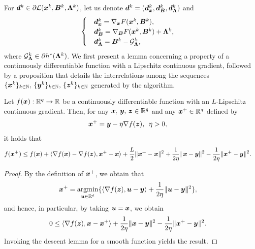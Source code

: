 For $\bm{d}^{k}\in \partial \mathcal{L}(\bm{x}^{k}, \bm{B}^{k}, \bm{\Lambda}^{k})$, let us
denote $\bm{d}^{k}= (\bm{d}_{\bm{x}}^{k}, \bm{d}_{\bm{B}}^{k}, \bm{d}_{\bm{\Lambda}}^{k})$ and
\begin{align}
    \begin{cases}&\bm{d}_{\bm{x}}^{k}= \nabla_{\bm{x}}F(\bm{x}^{k}, \bm{B}^{k}),\\&\bm{d}_{\bm{B}}^{k}= \nabla_{\bm{B}}F(\bm{x}^{k}, \bm{B}^{k}) + \bm{\Lambda}^{k}, \\&\bm{d}_{\bm{\Lambda}}^{k}= \bm{B}^{k}- \mathcal{G}_{\bm{\Lambda}}^{k},\end{cases} \notag
\end{align}
where $\mathcal{G}_{\bm{\Lambda}}^{k}\in \partial h^{*}(\bm{\Lambda}^{k})$.
We first present a lemma concerning a property of a continuously differentiable function with a Lipschitz continuous gradient, followed by a proposition that details the interrelations among the sequences $\{\bm{x}^{k}\}_{k \in \mathbb{N}},\, \{\bm{y}^{k}\}_{k \in \mathbb{N}},\, \{\bm{z}^{k}\}_{k \in \mathbb{N}}$ generated by the algorithm.
\begin{lemma}
    \label{Lemma: auxiliary lemma for f} Let $f(\bm{x}): \mathbb{R}^{q}\rightarrow \mathbb{R}$
    be a continuously differentiable function with an $L$-Lipschitz continuous gradient.
    Then, for any $\bm{x},\, \bm{y},\,\bm{z} \in \mathbb{R}^{q}$ and any $\bm{x}^{+}\in \mathbb{R}
    ^{q}$ defined by
    \[
        \bm{x}^{+}= \bm{y} - \eta \nabla f(\bm{z}), \hspace{5pt}\eta > 0,
    \]it holds that
    \begin{align}
        \label{Eq: auxiliary lemma for f}f(\bm{x}^{+}) \leq f(\bm{x}) + \langle \nabla f(\bm{x}) - \nabla f(\bm{z}), \bm{x}^{+}- \bm{x} \rangle + \frac{L}{2}\|\bm{x}^{+}- \bm{x}\|^{2}+ \frac{1}{2\eta}\|\bm{x} - \bm{y}\|^{2}- \frac{1}{2\eta}\|\bm{x}^{+}- \bm{y}\|^{2}.
    \end{align}
\end{lemma}
\begin{proof}
    By the definition of $\bm{x}^{+}$, we obtain that
    \[
        \bm{x}^{+}= \operatorname*{\mathrm{argmin}}\limits_{\bm{u} \in \mathbb{R}^d}\{ \langle \nabla f(\bm{z}), \bm{u}
        - \bm{y} \rangle + \frac{1}{2\eta}\| \bm{u} - \bm{y}\|^{2}\},
    \]
    and hence, in particular, by taking $\bm{u} = \bm{x}$, we obtain
    \begin{align*}
        0 \leq \langle \nabla f(\bm{z}), \bm{x} - \bm{x}^{+}\rangle + \frac{1}{2\eta}\| \bm{x} - \bm{y}\|^{2}- \frac{1}{2\eta}\| \bm{x}^{+}- \bm{y}\|^{2}.
    \end{align*}
    Invoking the descent lemma for a smooth function yields the result. 
\end{proof}
